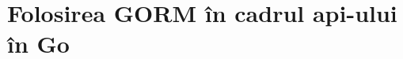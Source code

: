 \chapter{Folosirea GORM în cadrul api-ului în Go}

\label{annex:gorm}

\begin{code}
    \inputminted[frame=single,framesep=2mm,linenos,breaklines,tabsize=2]{go}{code/go-gorm.go}
    \label{code:go_connect_database_and_migrations}
\end{code}

\begin{code}
    \inputminted[frame=single,framesep=2mm,linenos,breaklines,tabsize=2]{go}{code/go-user-model.go}
    \label{code:go_user_model_gorm}
\end{code}

